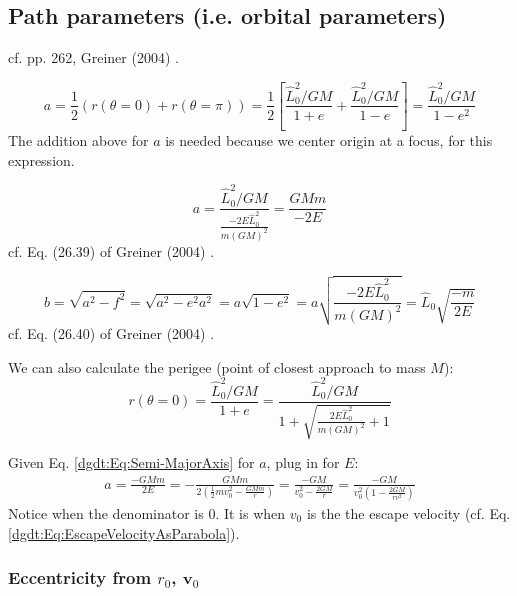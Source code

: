 \subsection{Path parameters (i.e. orbital parameters)}

cf. pp. 262, Greiner (2004) \cite{dgdt:Grei2004}.

\[
a = \frac{1}{2} ( r(\theta = 0) + r(\theta = \pi) ) = \frac{1}{2} \left[ \frac{ \widehat{L}_0^2 / GM }{ 1 + e } + \frac{\widehat{L}_0^2 / GM }{ 1- e} \right] = \frac{ \widehat{L}_0^2 / GM}{ 1 - e^2 }
\]
The addition above for $a$ is needed because we center origin at a focus, for this expression. 

\begin{equation}\label{dgdt:Eq:Semi-MajorAxis}
a = \frac{\widehat{L}_0^2 /GM}{ \frac{ - 2 E \widehat{L}_0^2 }{ m (GM)^2 } } = \frac{ GMm }{ - 2 E} 
\end{equation}
cf. Eq. (26.39) of Greiner (2004) \cite{dgdt:Grei2004}. 

\begin{equation}
b = \sqrt{ a^2 - f^2 } = \sqrt{a^2 - e^2 a^2 } = a \sqrt{ 1 - e^2 } = a \sqrt{ \frac{ -2 E \widehat{L}_0^2 }{ m (GM)^2 } } = \widehat{L}_0 \sqrt{ \frac{ - m}{ 2E} }
\end{equation}
cf. Eq. (26.40) of Greiner (2004) \cite{dgdt:Grei2004}. 

We can also calculate the perigee (point of closest approach to mass $M$):
\begin{equation}
r(\theta =0 ) = \frac{ \widehat{L}_0^2 / GM }{ 1 + e } = \frac{ \widehat{L}_0^2 / GM }{ 1 + \sqrt{ \frac{ 2 E \widehat{L}_0^2 }{ m (GM)^2 } + 1 } }
\end{equation}

Given Eq. \ref{dgdt:Eq:Semi-MajorAxis} for $a$, plug in for $E$:
\begin{equation}
\begin{gathered}
a = \frac{ - GMm}{2 E} = - \frac{GMm}{ 2 \left( \frac{1}{2} m v_0^2 - \frac{GMm}{r} \right) } = \frac{ -GM }{ v_0^2 - \frac{2GM}{r} } = \frac{ - GM }{ v_0^2 \left( 1 - \frac{2 GM}{ rv^2 }\right)} 
\end{gathered}
\end{equation}
Notice when the denominator is 0. It is when $v_0$ is the the escape velocity (cf. Eq. \ref{dgdt:Eq:EscapeVelocityAsParabola}). 

\subsubsection{Eccentricity from $r_0$, $\mathbf{v}_0$}

